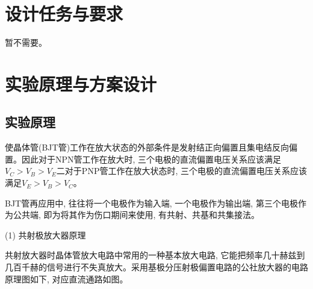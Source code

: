 \documentclass[10pt, a4paper]{article} %
\begin{document}
\section{设计任务与要求}

暂不需要。

\section{实验原理与方案设计}
\subsection{实验原理}
使晶体管(BJT管)工作在放大状态的外部条件是发射结正向偏置且集电结反向偏置。因此对于NPN管工作在放大时, 三个电极的直流偏置电压关系应该满足$V_C > V_B > V_E$二对于PNP管工作在放大状态时, 三个电极的直流偏置电压关系应该满足$V_E > V_B > V_C$。

BJT管再应用中, 往往将一个电极作为输入端, 一个电极作为输出端, 第三个电极作为公共端, 即为将其作为伤口期间来使用, 有共射、共基和共集接法。
    
(1) 共射极放大器原理

共射放大器时晶体管放大电路中常用的一种基本放大电路, 它能把频率几十赫兹到几百千赫的信号进行不失真放大。采用基极分压射极偏置电路的公社放大器的电路原理图如下, 对应直流通路如图。
\end{document}
